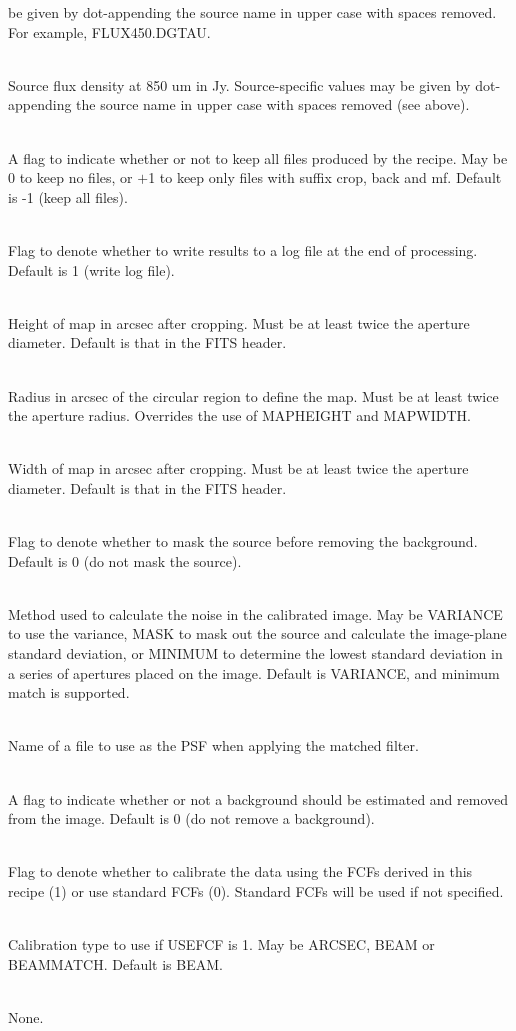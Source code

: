 \documentclass[twoside,11pt]{article}
\renewcommand{\_}{\texttt{\symbol{95}}}
\newcommand{\sstsubsection}[1]{ \item[{#1}] \mbox{} \\}
\newcommand{\sstdiytopic}[2]{\item[{\hspace{-0.35em}#1\hspace{-0.35em}:}]
\mbox{} \\[1.3ex] #2}
\newcommand{\sstsubsection}[1]{\item[{#1}]}
\newcommand{\sstdiytopic}[2]{\item[{#1}] #2 }
\begin{document}
{{{         be given by dot-appending the source name in upper case with
         spaces removed. For example, FLUX\_450.DGTAU.
      }
      \sstsubsection{
         FLUX\_850
      }{
         Source flux density at 850 um in Jy. Source-specific values may
         be given by dot-appending the source name in upper case with
         spaces removed (see above).
      }
      \sstsubsection{
         KEEPFILES
      }{
         A flag to indicate whether or not to keep all files produced by
         the recipe. May be 0 to keep no files, or $+$1 to keep only files
         with suffix \_crop, \_back and \_mf. Default is -1 (keep all
         files).
      }
      \sstsubsection{
         LOGFILE
      }{
         Flag to denote whether to write results to a log file at the
         end of processing. Default is 1 (write log file).
      }
      \sstsubsection{
         MAP\_HEIGHT
      }{
         Height of map in arcsec after cropping. Must be at least twice
         the aperture diameter. Default is that in the FITS header.
      }
      \sstsubsection{
         MAP\_RADIUS
      }{
         Radius in arcsec of the circular region to define the map. Must
         be at least twice the aperture radius. Overrides the use of
         MAP\_HEIGHT and MAP\_WIDTH.
      }
      \sstsubsection{
         MAP\_WIDTH
      }{
         Width of map in arcsec after cropping. Must be at least twice
         the aperture diameter. Default is that in the FITS header.
      }
      \sstsubsection{
         MASK\_SOURCE
      }{
         Flag to denote whether to mask the source before removing the
         background. Default is 0 (do not mask the source).
      }
      \sstsubsection{
         NOISE\_METHOD
      }{
         Method used to calculate the noise in the calibrated image. May
         be VARIANCE to use the variance, MASK to mask out the source
         and calculate the image-plane standard deviation, or MINIMUM to
         determine the lowest standard deviation in a series of
         apertures placed on the image. Default is VARIANCE, and minimum
         match is supported.
      }
      \sstsubsection{
         PSF\_MATCHFILTER
      }{
         Name of a file to use as the PSF when applying the matched
         filter.
      }
      \sstsubsection{
         REMOVE\_BACKGROUND
      }{
         A flag to indicate whether or not a background should be
         estimated and removed from the image. Default is 0 (do not
         remove a background).
      }
      \sstsubsection{
         USEFCF
      }{
         Flag to denote whether to calibrate the data using the FCFs
         derived in this recipe (1) or use standard FCFs (0). Standard
         FCFs will be used if not specified.
      }
      \sstsubsection{
         USEFCF\_CALTYPE
      }{
         Calibration type to use if USEFCF is 1. May be ARCSEC, BEAM or
         BEAMMATCH. Default is BEAM.
      }
   }
   \sstdiytopic{
      Display
   }{
      None.
   }
}
\end{document}
